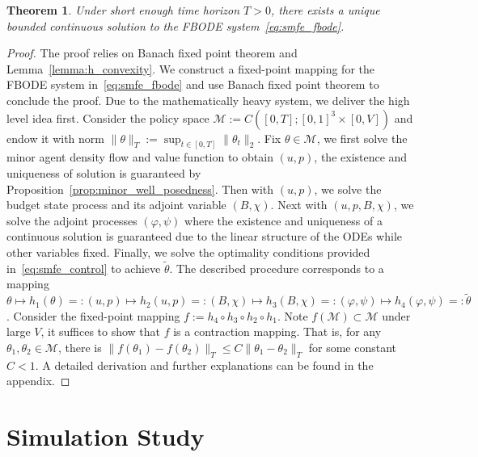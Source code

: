 \documentclass[letterpaper, 10 pt, conference]{ieeeconf}  %
\newtheorem{theorem}{Theorem}[section]
\begin{document}
\begin{theorem}
    \label{thm:well_posedness}
    Under short enough time horizon $T > 0$, there exists a unique bounded continuous solution to the FBODE system~\eqref{eq:smfe_fbode}.
\end{theorem}


\begin{proof}
    The proof relies on Banach fixed point theorem and Lemma~\ref{lemma:h_convexity}. We construct a fixed-point mapping for the FBODE system in~\eqref{eq:smfe_fbode} and use Banach fixed point theorem to conclude the proof. Due to the mathematically heavy system, we deliver the high level idea first. Consider the policy space $\mathcal{M} := C([0,T];[0,1]^3 \times [0,V])$ and endow it with norm $\|\theta\|_T := \sup_{t\in[0,T]} \|\theta_t\|_2$. Fix $\theta \in \mathcal{M}$, we first solve the minor agent density flow and value function to obtain $(u,p)$, the existence and uniqueness of solution is guaranteed by Proposition~\ref{prop:minor_well_posedness}. Then with $(u,p)$, we solve the budget state process and its adjoint variable $(B, \chi)$. Next with $(u,p,B,\chi)$, we solve the adjoint processes $(\varphi,\psi)$ where the existence and uniqueness of a continuous solution is guaranteed due to the linear structure of the ODEs while other variables fixed. Finally, we solve the optimality conditions provided in~\eqref{eq:smfe_control} to achieve $\tilde{\theta}$. The described procedure corresponds to a mapping $\theta \mapsto h_1(\theta) =: (u,p) \mapsto h_2(u,p) =: (B,\chi) \mapsto h_3(B, \chi) =: (\varphi,\psi) \mapsto h_4(\varphi,\psi) =: \tilde{\theta}$.
    Consider the fixed-point mapping $f := h_4 \circ h_3 \circ h_2 \circ h_1$. Note $f(\mathcal{M}) \subset \mathcal{M}$ under large $V$, 
it suffices to show that $f$ is a contraction mapping. That is, for any $\theta_1, \theta_2 \in \mathcal{M}$, there is $\|f(\theta_1) - f(\theta_2)\|_T \leq C \|\theta_1 - \theta_2\|_T$ for some constant $C < 1$. A detailed derivation and further explanations can be found in the appendix.
\end{proof}

\section{Simulation Study}
\label{sec:simulation_study}
\end{document}
